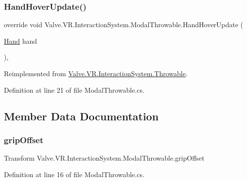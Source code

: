 \subsubsection{\texorpdfstring{HandHoverUpdate()}{HandHoverUpdate()}}
{\footnotesize\ttfamily override void Valve.\+V\+R.\+Interaction\+System.\+Modal\+Throwable.\+Hand\+Hover\+Update (\begin{DoxyParamCaption}\item[{\mbox{\hyperlink{class_valve_1_1_v_r_1_1_interaction_system_1_1_hand}{Hand}}}]{hand }\end{DoxyParamCaption})\hspace{0.3cm}{\ttfamily [protected]}, {\ttfamily [virtual]}}



Reimplemented from \mbox{\hyperlink{class_valve_1_1_v_r_1_1_interaction_system_1_1_throwable_a8a5523917812ed611fe385c195c8e55f}{Valve.\+V\+R.\+Interaction\+System.\+Throwable}}.



Definition at line 21 of file Modal\+Throwable.\+cs.



\subsection{Member Data Documentation}
\mbox{\label{class_valve_1_1_v_r_1_1_interaction_system_1_1_modal_throwable_a04d6a81705e8aed8d501a629e80a086d}} 
\subsubsection{\texorpdfstring{gripOffset}{gripOffset}}
{\footnotesize\ttfamily Transform Valve.\+V\+R.\+Interaction\+System.\+Modal\+Throwable.\+grip\+Offset}



Definition at line 16 of file Modal\+Throwable.\+cs.

\mbox{\label{class_valve_1_1_v_r_1_1_interaction_system_1_1_modal_throwable_a370037d59bf27830e49552a631c7b83c}} 
